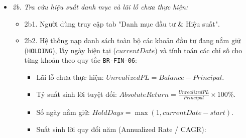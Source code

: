 \documentclass[11pt,a4paper]{article}
\providecommand{\tightlist}{
  \setlength{\itemsep}{0pt}\setlength{\parskip}{0pt}}
\begin{document}
\begin{itemize}
\begin{itemize}
    \begin{itemize}
    \tightlist
    \item
      2a1. Người dùng chọn chức năng "Cập nhật NAV thị trường".
    \item
      2a2. Hệ thống hiển thị biểu mẫu cập nhật: Danh sách chọn Mã chứng
      chỉ quỹ đang nắm giữ, Ngày cập nhật (\texttt{updateDate}, mặc định
      hôm nay), Đơn giá NAV mới nhất (\texttt{latestNav}).
    \item
      2a3. Người dùng chọn mã quỹ (ví dụ: \texttt{DCDS}), nhập giá trị
      NAV mới (ví dụ: 58,250 VNĐ/CCQ) và nhấn "Cập nhật".
    \item
      2a4. Hệ thống kiểm tra điều kiện \(latestNav > 0\).
    \item
      2a5. Hệ thống tìm tất cả các khoản đầu tư đang mở
      (\texttt{HOLDING}) thuộc mã quỹ này.
    \item
      2a6. Với từng khoản đầu tư, hệ thống định giá lại theo nguyên tắc
      Mark-to-Market tại quy tắc \texttt{BR-FIN-06}:
      \[Balance = Units \times latestNav\] Cập nhật trường
      \texttt{currentNav\ =\ latestNav} và \texttt{balance\ =\ Balance}.
    \item
      2a7. Hệ thống thêm bản ghi biến động giá vào bảng
      \texttt{fund\_performance} (mã quỹ, ngày cập nhật, đơn giá NAV
      mới).
    \item
      2a8. Nếu các khoản đầu tư này có liên kết với quỹ mục tiêu, hệ
      thống cập nhật lại tổng giá trị tích lũy của quỹ mục tiêu tương
      ứng theo \texttt{BR-FIN-08}.
    \item
      2a9. Hệ thống thông báo cập nhật NAV thành công và làm mới bảng
      định giá danh mục đầu tư trên màn hình.
    \end{itemize}
  \item
    \emph{2b. Tra cứu hiệu suất danh mục và lãi lỗ chưa thực hiện:}

    \begin{itemize}
    \tightlist
    \item
      2b1. Người dùng truy cập tab "Danh mục đầu tư \& Hiệu suất".
    \item
      2b2. Hệ thống nạp danh sách toàn bộ các khoản đầu tư đang nắm giữ
      (\texttt{HOLDING}), lấy ngày hiện tại (\(currentDate\)) và tính
      toán các chỉ số cho từng khoản theo quy tắc \texttt{BR-FIN-06}:

      \begin{itemize}
      \tightlist
      \item
        Lãi lỗ chưa thực hiện: \(UnrealizedPL = Balance - Principal\).
      \item
        Tỷ suất sinh lời tuyệt đối:
        \(AbsoluteReturn = \frac{UnrealizedPL}{Principal} \times 100\%\).
      \item
        Số ngày nắm giữ: \(HoldDays = \max(1, currentDate - start)\).
      \item
        Suất sinh lời quy đổi năm (Annualized Rate / CAGR):


\end{itemize}
\end{itemize}
\end{itemize}
\end{itemize}
\end{document}
